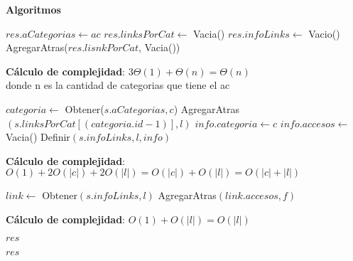\documentclass[10pt, a4paper]{article}
\let\TipoVariable=\texttt
\let\ModificadorArgumento=\textbf
\newcommand{\In}[2]{\ModificadorArgumento{in} \ensuremath{#1}\,: \TipoVariable{#2}\xspace}
\newcommand{\Inout}[2]{\ModificadorArgumento{in/out} \ensuremath{#1}\,: \TipoVariable{#2}\xspace}
\newenvironment{Servicios Usados}{%
  \vspace*{2ex}
  \noindent\textbf{\Large Servicios Usados}%
  \vspace*{2ex}
}{}
\newenvironment{Algoritmos}{%
  \vspace*{2ex}%
  \noindent\textbf{\Large Algoritmos}%
  \vspace*{2ex}%
}{}
\newcommand{\DRef}{\ensuremath{\rightarrow}}
\begin{document}
\begin{Algoritmos}

\begin{algorithm}[H]
\caption*{iCrearLinkLinkIt(\In{ac}{abCat}) $\DRef res$ : \TipoVariable{LinkLinkIt}}
\begin{algorithmic}[1]
	\State $res.aCategorias \gets ac$
	\State $res.linksPorCat \gets$ Vacia()
	\State $res.infoLinks \gets$ Vacio()
	\\
	 
	\State AgregarAtras($res.lisnkPorCat$, Vacia()) 
	\EndFor
\end{algorithmic}
\textbf{C\'alculo de complejidad}: $3\Theta(1) + \Theta(n)= \Theta(n)$
\\ donde n es la cantidad de categorias que tiene el ac
\end{algorithm}

\begin{algorithm}[H]
\caption*{iAgregarLink(\Inout{s}{LinkLinkIt}, \In{l}{link}, \In{c}{categoria})}
\begin{algorithmic}[1]
	\State $categoria \gets$ Obtener($s.aCategorias, c$)
	\State AgregarAtras$(s.linksPorCat[(categoria.id-1)], l)$
	\Statex
	\State $info.categoria \gets c$
	\State $info.accesos \gets $Vacia()
	\State Definir$(s.infoLinks, l, info)$
\end{algorithmic}
\textbf{C\'alculo de complejidad}: $O(1) + 2O(|c|) + 2O(|l|) = O(|c|) + O(|l|) = O(|c| + |l|)$
\end{algorithm}

\begin{algorithm}[H]
\caption*{iAccederLink(\Inout{s}{LinkLinkIt}, \In{l}{link}, \In{f}{fecha})}
\begin{algorithmic}[1]
	\State $link \gets$ Obtener$(s.infoLinks, l)$
	\State AgregarAtras$(link.accesos, f)$
\end{algorithmic}
\textbf{C\'alculo de complejidad}: $O(1) + O(|l|) = O(|l|)$
\end{algorithm}

\begin{algorithm}[H]
\caption*{iCantLinks(\In{s}{LinkLinkIt}, \In{c}{categoria}) $\DRef res$ : \TipoVariable{Nat}}
\begin{algorithmic}[1]
	\State $res$
\end{algorithmic}
\end{algorithm}

\begin{algorithm}[H]
\caption*{iLinksOrdenadosPorAccesos(\Inout{s}{LinkLinkIt}, \In{c}{categoria}) $\DRef res$ : \TipoVariable{itLinks}}
\begin{algorithmic}[1]
	\State $res$
\end{algorithmic}
\end{algorithm}

\end{Algoritmos}
\end{document}
